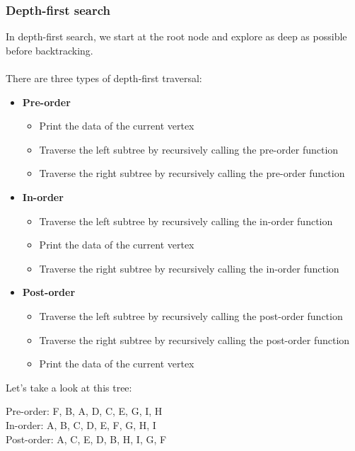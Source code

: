 \documentclass[a4paper]{article}
\begin{document}
\subsubsection{Depth-first search}
In depth-first search, we start at the root node and explore as deep as possible before backtracking.\\\\
There are three types of depth-first traversal:
\begin{itemize}
	\item \textbf{Pre-order}
	\begin{itemize}
		\item Print the data of the current vertex
		\item Traverse the left subtree by recursively calling the pre-order function
		\item Traverse the right subtree by recursively calling the pre-order function
	\end{itemize}
	\item \textbf{In-order}
	\begin{itemize}
		\item Traverse the left subtree by recursively calling the in-order function
		\item Print the data of the current vertex
		\item Traverse the right subtree by recursively calling the in-order function
	\end{itemize}
	\item \textbf{Post-order}
	\begin{itemize}
		\item Traverse the left subtree by recursively calling the post-order function
		\item Traverse the right subtree by recursively calling the post-order function
		\item Print the data of the current vertex
	\end{itemize}
\end{itemize}
Let's take a look at this tree:
\begin{center}
\end{center}
Pre-order: F, B, A, D, C, E, G, I, H\\
In-order: A, B, C, D, E, F, G, H, I\\
Post-order: A, C, E, D, B, H, I, G, F
\end{document}
